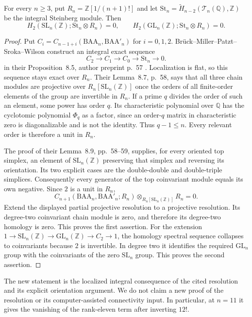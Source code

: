 \begin{proposition}[K17-ST2-LOCAL]\label{prop:steinberg-two-local}
For every $n\ge3$, put $R_n=\mathbb Z[1/(n+1)!]$ and let
$\mathrm{St}_n=\widetilde H_{n-2}(\mathcal T_n(\mathbb Q),\mathbb Z)$
be the integral Steinberg module. Then
\[
 H_2(\mathrm{SL}_n(\mathbb Z);\mathrm{St}_n\otimes R_n)=0,
 \qquad
 H_2(\mathrm{GL}_n(\mathbb Z);\mathrm{St}_n\otimes R_n)=0.
\]
\end{proposition}

\begin{proof}
Put $C_i=C_{n-1+i}(\mathrm{BAA}_n,\mathrm{BAA}'_n)$ for
$i=0,1,2$. Br\"uck--Miller--Patzt--Sroka--Wilson construct an integral
exact sequence
\[
 C_2\longrightarrow C_1\longrightarrow C_0
 \longrightarrow\mathrm{St}_n\longrightarrow0.
\]
in their Proposition~8.5, author preprint p.~57
\cite{BrueckEtAl2024}. Localization is flat, so this sequence stays exact
over $R_n$. Their Lemma~8.7, p.~58, says that all three chain modules
are projective over $R_n[\mathrm{SL}_n(\mathbb Z)]$ once the orders of
all finite-order elements of the group are invertible in $R_n$.
If a prime $q$ divides the order of such an element, some power has
order $q$. Its characteristic polynomial over $\mathbb Q$ has the
cyclotomic polynomial $\Phi_q$ as a factor, since an order-$q$ matrix
in characteristic zero is diagonalizable and is not the identity.
Thus $q-1\le n$. Every relevant order is therefore a unit in $R_n$.

The proof of their Lemma~8.9, pp.~58--59, supplies, for every
oriented top simplex, an element of $\mathrm{SL}_n(\mathbb Z)$
preserving that simplex and reversing its orientation. Its two
explicit cases are the double-double and double-triple simplices.
Consequently every generator of the top coinvariant module equals
its own negative. Since $2$ is a unit in $R_n$,
\[
 C_{n+1}(\mathrm{BAA}_n,\mathrm{BAA}'_n;R_n)
     \otimes_{R_n[\mathrm{SL}_n(\mathbb Z)]}R_n=0.
\]
Extend the displayed partial projective resolution to a projective
resolution. Its degree-two coinvariant chain module is zero, and
therefore its degree-two homology is zero. This proves the first
assertion. For the extension
$1\to\mathrm{SL}_n(\mathbb Z)\to\mathrm{GL}_n(\mathbb Z)
\to C_2\to1$, the homology spectral sequence collapses to
coinvariants because $2$ is invertible. In degree two it identifies
the required $\mathrm{GL}_n$ group with the coinvariants of the zero
$\mathrm{SL}_n$ group. This proves the second assertion.
\end{proof}

The new statement is the localized integral consequence of the cited
resolution and its explicit orientation argument. We do not claim a
new proof of the resolution or its computer-assisted connectivity
input. In particular, at $n=11$ it gives the vanishing of the
rank-eleven term after inverting $12!$.

